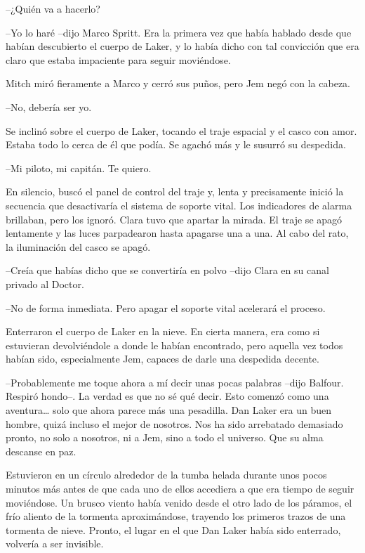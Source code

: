 {--¿Quién va a hacerlo?}

{--Yo lo haré --dijo Marco Spritt. Era la primera vez que había hablado
 desde que habían descubierto el cuerpo de Laker, y lo había dicho con
 tal convicción que era claro que estaba impaciente para seguir
moviéndose.}

{Mitch miró fieramente a Marco y cerró sus puños, pero Jem negó con la
cabeza.}

{--No, debería ser yo.}

{Se inclinó sobre el cuerpo de Laker, tocando el traje espacial y el
 casco con amor. Estaba todo lo cerca de él que podía. Se agachó más y le
susurró su despedida.}

{--Mi piloto, mi capitán. Te quiero.}

{En silencio, buscó el panel de control del traje y, lenta y precisamente
 inició la secuencia que desactivaría el sistema de soporte vital. Los
 indicadores de alarma brillaban, pero los ignoró. Clara tuvo que apartar
 la mirada. El traje se apagó lentamente y las luces parpadearon hasta
 apagarse una a una. Al cabo del rato, la iluminación del casco se
apagó.}

{--Creía que habías dicho que se convertiría en polvo --dijo Clara en su
canal privado al Doctor.}

{--No de forma inmediata. Pero apagar el soporte vital acelerará el
proceso.}

{Enterraron el cuerpo de Laker en la nieve. En cierta manera, era como si
 estuvieran devolviéndole a donde le habían encontrado, pero aquella vez
 todos habían sido, especialmente Jem, capaces de darle una despedida
decente.}

{--Probablemente me toque ahora a mí decir unas pocas palabras --dijo
 Balfour. Respiró hondo--. La verdad es que no sé qué decir. Esto comenzó
 como una aventura\ldots{} solo que ahora parece más una pesadilla. Dan
 Laker era un buen hombre, quizá incluso el mejor de nosotros. Nos ha
 sido arrebatado demasiado pronto, no solo a nosotros, ni a Jem, sino a
todo el universo. Que su alma descanse en paz.}

{Estuvieron en un círculo alrededor de la tumba helada durante unos pocos
 minutos más antes de que cada uno de ellos accediera a que era tiempo de
 seguir moviéndose. Un brusco viento había venido desde el otro lado de
 los páramos, el frío aliento de la tormenta aproximándose, trayendo los
 primeros trazos de una tormenta de nieve. Pronto, el lugar en el que Dan
 Laker había sido enterrado, volvería a ser
 invisible.}

